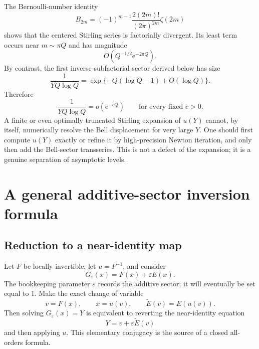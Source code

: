 \documentclass[11pt]{article}
\numberwithin{equation}{section}
\theoremstyle{mainthm}
\theoremstyle{defstyle}
\theoremstyle{remark}
\newcommand{\e}{\mathrm e}
\begin{document}
The Bernoulli-number identity
\[
 B_{2m}=(-1)^{m-1}\frac{2(2m)!}{(2\pi)^{2m}}\zeta(2m)
\]
shows that the centered Stirling series is factorially divergent.  Its least term occurs near \(m\sim\pi Q\) and has magnitude
\begin{equation}\label{eq:stirling-least-term}
 O\!\left(Q^{-1/2}\e^{-2\pi Q}\right).
\end{equation}
By contrast, the first inverse-subfactorial sector derived below has size
\begin{equation}\label{eq:bell-sector-size-pre}
 \frac1{YQ\log Q}
 =\exp\{-Q(\log Q-1)+O(\log Q)\}.
\end{equation}
Therefore
\begin{equation}\label{eq:bell-beyond-fixed-exp}
 \frac1{YQ\log Q}=o(\e^{-cQ})
 \qquad\text{for every fixed }c>0.
\end{equation}
A finite or even optimally truncated Stirling expansion of \(u(Y)\) cannot, by itself, numerically resolve the Bell displacement for very large \(Y\).  One should first compute \(u(Y)\) exactly or refine it by high-precision Newton iteration, and only then add the Bell-sector transseries.  This is not a defect of the expansion; it is a genuine separation of asymptotic levels.

\section{A general additive-sector inversion formula}\label{sec:additive-inversion}

\subsection{Reduction to a near-identity map}

Let \(F\) be locally invertible, let \(u=F^{-1}\), and consider
\begin{equation}\label{eq:G-epsilon}
 G_\varepsilon(x)=F(x)+\varepsilon E(x).
\end{equation}
The bookkeeping parameter \(\varepsilon\) records the additive sector; it will eventually be set equal to \(1\).  Make the exact change of variable
\[
 v=F(x),\qquad x=u(v),\qquad \widetilde E(v)=E(u(v)).
\]
Then solving \(G_\varepsilon(x)=Y\) is equivalent to reverting the near-identity equation
\begin{equation}\label{eq:v-near-identity}
 Y=v+\varepsilon\widetilde E(v)
\end{equation}
and then applying \(u\).  This elementary conjugacy is the source of a closed all-orders formula.
\end{document}
